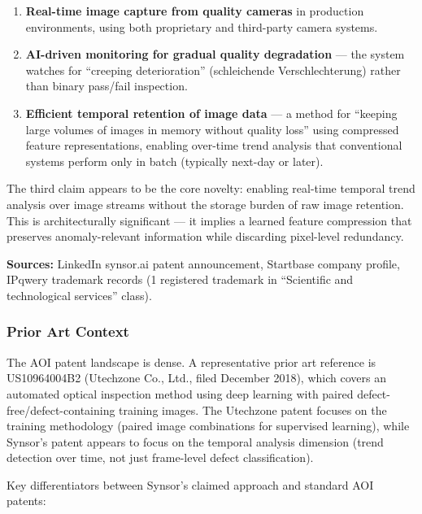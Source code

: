 \documentclass[11pt,letterpaper]{article}
\begin{document}
\begin{enumerate}[leftmargin=2em]
  \item \textbf{Real-time image capture from quality cameras} in production environments, using both proprietary and third-party camera systems.
  \item \textbf{AI-driven monitoring for gradual quality degradation} --- the system watches for ``creeping deterioration'' (schleichende Verschlechterung) rather than binary pass/fail inspection.
  \item \textbf{Efficient temporal retention of image data} --- a method for ``keeping large volumes of images in memory without quality loss'' using compressed feature representations, enabling over-time trend analysis that conventional systems perform only in batch (typically next-day or later).
\end{enumerate}

The third claim appears to be the core novelty: enabling real-time temporal trend analysis over image streams without the storage burden of raw image retention. This is architecturally significant --- it implies a learned feature compression that preserves anomaly-relevant information while discarding pixel-level redundancy.

\textbf{Sources:} LinkedIn synsor.ai patent announcement, Startbase company profile, IPqwery trademark records (1 registered trademark in ``Scientific and technological services'' class).

\subsubsection{Prior Art Context}

The AOI patent landscape is dense. A representative prior art reference is US10964004B2 (Utechzone Co., Ltd., filed December 2018), which covers an automated optical inspection method using deep learning with paired defect-free/defect-containing training images. The Utechzone patent focuses on the training methodology (paired image combinations for supervised learning), while Synsor's patent appears to focus on the temporal analysis dimension (trend detection over time, not just frame-level defect classification).

Key differentiators between Synsor's claimed approach and standard AOI patents:
\end{document}
